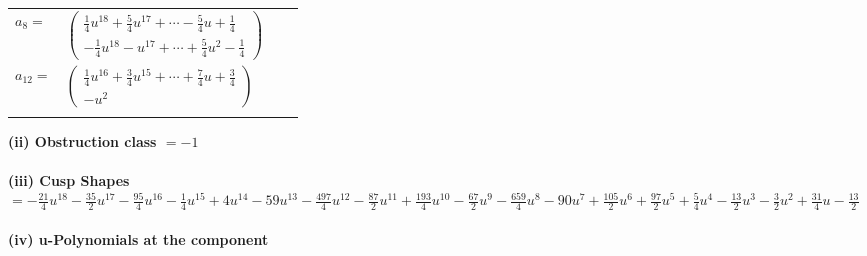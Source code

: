\documentclass[1p]{elsarticle_modified}
\theoremstyle{definition}
\begin{document}
\begin{tabular}{m{7pt} m{180pt} m{7pt} m{180pt} }
\flushright $a_{8}=$&$\begin{pmatrix}\frac{1}{4} u^{18}+\frac{5}{4} u^{17}+\cdots-\frac{5}{4} u+\frac{1}{4}\\-\frac{1}{4} u^{18}- u^{17}+\cdots+\frac{5}{4} u^2-\frac{1}{4}\end{pmatrix}$ \\
\flushright $a_{12}=$&$\begin{pmatrix}\frac{1}{4} u^{16}+\frac{3}{4} u^{15}+\cdots+\frac{7}{4} u+\frac{3}{4}\\- u^2\end{pmatrix}$\\&\end{tabular}
\flushleft \textbf{(ii) Obstruction class $= -1$}\\~\\
\flushleft \textbf{(iii) Cusp Shapes $= -\frac{21}{4} u^{18}-\frac{35}{2} u^{17}-\frac{95}{4} u^{16}-\frac{1}{4} u^{15}+4 u^{14}-59 u^{13}-\frac{497}{4} u^{12}-\frac{87}{2} u^{11}+\frac{193}{4} u^{10}-\frac{67}{2} u^9-\frac{659}{4} u^8-90 u^7+\frac{105}{2} u^6+\frac{97}{2} u^5+\frac{5}{4} u^4-\frac{13}{2} u^3-\frac{3}{2} u^2+\frac{31}{4} u-\frac{13}{2}$}\\~\\
\newpage\renewcommand{\arraystretch}{1}
\flushleft \textbf{(iv) u-Polynomials at the component}\newline \\
\end{document}
